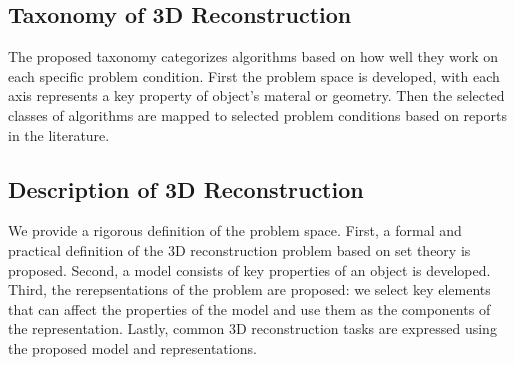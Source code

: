 \subsection{Taxonomy of 3D Reconstruction}
The proposed taxonomy categorizes algorithms based on how well they work on each specific problem condition. First the problem space is developed, with each axis represents a key property of object's materal or geometry. Then the selected classes of algorithms are mapped to selected problem conditions based on reports in the literature.

\subsection{Description of 3D Reconstruction}
We provide a rigorous definition of the problem space. First, a formal and practical definition of the 3D reconstruction problem based on set theory is proposed. Second, a model consists of key properties of an object is developed. Third, the rerepsentations of the problem are proposed: we select key elements that can affect the properties of the model and use them as the components of the representation. Lastly, common 3D reconstruction tasks are expressed using the proposed model and representations.



